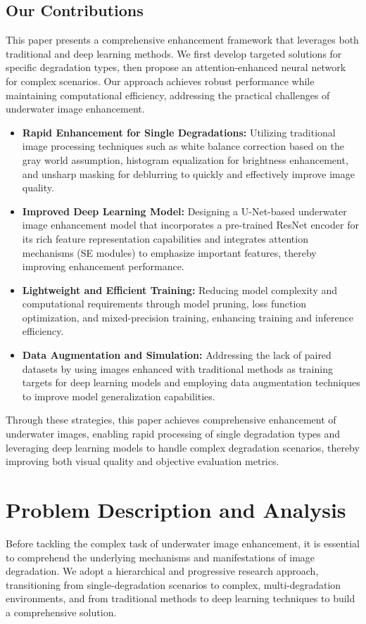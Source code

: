 \documentclass{apmcmthesis}
\begin{document}
\subsection{Our Contributions}
This paper presents a comprehensive enhancement framework that leverages both traditional and deep learning methods. We first develop targeted solutions for specific degradation types, then propose an attention-enhanced neural network for complex scenarios. Our approach achieves robust performance while maintaining computational efficiency, addressing the practical challenges of underwater image enhancement.

\begin{itemize}
    \item \textbf{Rapid Enhancement for Single Degradations:} Utilizing traditional image processing techniques such as white balance correction based on the gray world assumption, histogram equalization for brightness enhancement, and unsharp masking for deblurring to quickly and effectively improve image quality.
    \item \textbf{Improved Deep Learning Model:} Designing a U-Net-based \cite{ronneberger2015u} underwater image enhancement model that incorporates a pre-trained ResNet encoder \cite{he2016deep} for its rich feature representation capabilities and integrates attention mechanisms (SE modules) to emphasize important features, thereby improving enhancement performance.
    \item \textbf{Lightweight and Efficient Training:} Reducing model complexity and computational requirements through model pruning, loss function optimization, and mixed-precision training, enhancing training and inference efficiency.
    \item \textbf{Data Augmentation and Simulation:} Addressing the lack of paired datasets by using images enhanced with traditional methods as training targets for deep learning models and employing data augmentation techniques to improve model generalization capabilities.
\end{itemize}

Through these strategies, this paper achieves comprehensive enhancement of underwater images, enabling rapid processing of single degradation types and leveraging deep learning models to handle complex degradation scenarios, thereby improving both visual quality and objective evaluation metrics.

\section{Problem Description and Analysis}
Before tackling the complex task of underwater image enhancement, it is essential to comprehend the underlying mechanisms and manifestations of image degradation. We adopt a hierarchical and progressive research approach, transitioning from single-degradation scenarios to complex, multi-degradation environments, and from traditional methods to deep learning techniques to build a comprehensive solution.
\end{document}
